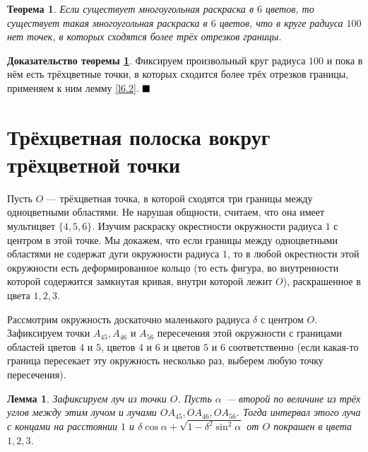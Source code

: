\documentclass[12pt,a4paper]{article}
\newtheorem{theorem}{Теорема}
\newtheorem{lemma}{Лемма}
\renewcommand{\qed}{$\blacksquare \vspace{5mm}$}
\begin{document}
\begin{theorem} \label{t4}
	Если существует многоугольная раскраска в $6$ цветов, то существует такая многоугольная раскраска в $6$ цветов, что в круге радиуса $100$ нет точек, в которых сходятся более трёх отрезков границы.
\end{theorem}

\textbf{Доказательство теоремы \ref{t4}}. Фиксируем произвольный круг радиуса $100$ и пока в нём есть трёхцветные точки, в которых сходится более трёх отрезков границы, применяем к ним лемму \ref{l6.2}. \qed

\section{Трёхцветная полоска вокруг трёхцветной точки}

Пусть $O$ --- трёхцветная точка, в которой сходятся три границы между одноцветными областями. Не нарушая общности, считаем, что она имеет мультицвет $\{4, 5, 6\}.$ Изучим раскраску окрестности окружности радиуса $1$ с центром в этой точке. Мы докажем, что если границы между одноцветными областями не содержат дуги окружности радиуса $1$, то в любой окрестности этой окружности есть деформированное кольцо (то есть фигура, во внутренности которой содержится замкнутая кривая, внутри которой лежит $O$), раскрашенное в цвета $1, 2, 3$.

Рассмотрим окружность доскаточно маленького радиуса $\delta$ с центром $O$. Зафиксируем точки $A_{45}, A_{46}$ и $A_{56}$ пересечения этой окружности с границами областей цветов $4$ и $5$, цветов $4$ и $6$ и цветов $5$ и $6$ соответственно (если какая-то граница пересекает эту окружность несколько раз, выберем любую точку пересечения).

\begin{lemma} \label{l5}
	Зафиксируем луч из точки $O$. Пусть $\alpha$ --- второй по величине из трёх углов между этим лучом и лучами $OA_{45}, OA_{46}, OA_{56}$. Тогда интервал этого луча с концами на расстоянии $1$ и $\delta \cos \alpha + \sqrt{1 - \delta^2 \sin^2\alpha}$ от $O$ покрашен в цвета $1, 2, 3$.
\end{lemma}
\end{document}
